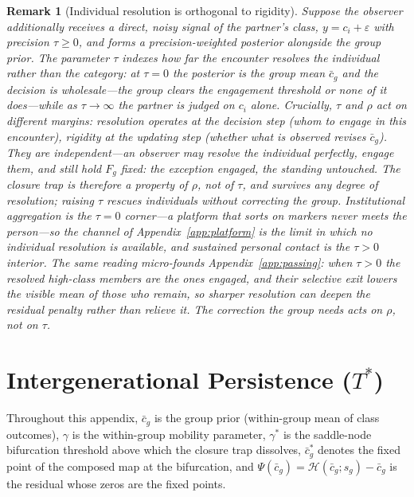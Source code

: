 \documentclass[pdflatex,sn-basic]{sn-jnl}
\theoremstyle{thmstyleone}
\newtheorem{remark}[proposition]{Remark}
\numberwithin{proposition}{subsection}
\begin{document}
\begin{remark}[Individual resolution is orthogonal to rigidity]
\label{rem:resolution}
Suppose the observer additionally receives a direct, noisy signal of the
partner's class, $y = c_i + \varepsilon$ with precision $\tau \ge 0$, and
forms a precision-weighted posterior alongside the group prior. The
parameter $\tau$ indexes how far the encounter resolves the individual
rather than the category: at $\tau = 0$ the posterior is the group mean
$\bar{c}_g$ and the decision is wholesale---the group clears the
engagement threshold or none of it does---while as $\tau \to \infty$ the
partner is judged on $c_i$ alone. Crucially, $\tau$ and $\rho$ act on
different margins: resolution operates at the \emph{decision} step (whom
to engage in this encounter), rigidity at the \emph{updating} step
(whether what is observed revises $\bar{c}_g$). They are independent---an
observer may resolve the individual perfectly, engage them, and still
hold $F_g$ fixed: the exception engaged, the standing untouched. The
closure trap is therefore a property of $\rho$, not of $\tau$, and
survives any degree of resolution; raising $\tau$ rescues individuals
without correcting the group. Institutional aggregation is the
$\tau = 0$ corner---a platform that sorts on markers never meets the
person---so the channel of Appendix~\ref{app:platform} is the limit in
which no individual resolution is available, and sustained personal
contact is the $\tau > 0$ interior. The same reading micro-founds
Appendix~\ref{app:passing}: when $\tau > 0$ the resolved high-class
members are the ones engaged, and their selective exit lowers the
visible mean of those who remain, so sharper resolution can deepen the
residual penalty rather than relieve it. The correction the group needs
acts on $\rho$, not on $\tau$.
\end{remark}

\section{Intergenerational Persistence (\texorpdfstring{$T^*$}{T*})}
\label{app:Tstar}

Throughout this appendix, $\bar{c}_g$ is the group prior (within-group
mean of class outcomes), $\gamma$ is the within-group mobility
parameter, $\gamma^*$ is the saddle-node bifurcation threshold above
which the closure trap dissolves, $\bar{c}_g^*$ denotes the
fixed point of the composed map at the bifurcation, and
$\Psi(\bar{c}_g) = \mathcal{H}(\bar{c}_g; s_g) - \bar{c}_g$ is the
residual whose zeros are the fixed points.
\end{document}
